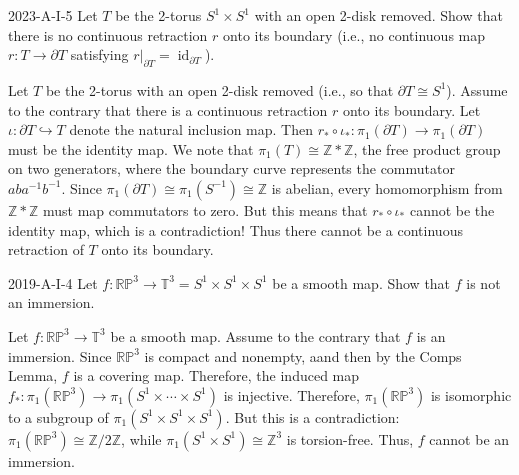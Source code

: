 \documentclass{article}
\begin{document}
	\begin{prb}{2023-A-I-5}
		Let $T$ be the 2-torus $S^{1} \times S^{1}$ with an open 2-disk removed. Show that there is no continuous retraction $r$ onto its boundary (i.e., no continuous map $r: T \to \partial T$ satisfying $r|_{\partial T} = \operatorname{id}_{\partial T}$). 
	\end{prb}
	Let $T$ be the 2-torus with an open 2-disk removed (i.e., so that $\partial T \cong S^{1}$). Assume to the contrary that there is a continuous retraction $r$ onto its boundary. Let $\iota : \partial T \hookrightarrow T$ denote the natural inclusion map. Then $r_{\ast} \circ \iota_{\ast}: \pi_{1}(\partial T) \to \pi_{1}(\partial T)$ must be the identity map. We note that $\pi_{1}(T) \cong \mathbb{Z} \ast \mathbb{Z}$, the free product group on two generators, where the boundary curve represents the commutator $aba^{-1}b^{-1}$. Since $\pi_{1}(\partial T) \cong \pi_{1}(S^{-1}) \cong \mathbb{Z}$ is abelian, every homomorphism from $\mathbb{Z} \ast \mathbb{Z}$ must map commutators to zero. But this means that $r_{\ast} \circ \iota_{\ast}$ cannot be the identity map, which is a contradiction! Thus there cannot be a continuous retraction of $T$ onto its boundary. 
	
	\begin{prb}{2019-A-I-4}
		Let $f: \mathbb{RP}^{3} \to \mathbb{T}^{3} = S^{1} \times S^{1} \times S^{1}$ be a smooth map. Show that $f$ is not an immersion. 
	\end{prb}
	Let $f: \mathbb{RP}^{3} \to \mathbb{T}^{3}$ be a smooth map. Assume to the contrary that $f$ is an immersion. Since $\mathbb{RP}^{3}$ is compact and nonempty, aand then by the Comps Lemma, $f$ is a covering map. Therefore, the induced map $f_{\ast}: \pi_{1}(\mathbb{RP}^{3}) \to \pi_{1}(S^{1} \times \dotsm \times S^{1})$ is injective. Therefore, $\pi_{1}(\mathbb{RP}^{3})$ is isomorphic to a subgroup of $\pi_{1}(S^{1} \times S^{1} \times S^{1})$. But this is a contradiction: $\pi_{1}(\mathbb{RP}^{3}) \cong \mathbb{Z}/2\mathbb{Z}$, while $\pi_{1}(S^{1} \times S^{1}) \cong \mathbb{Z}^{3}$ is torsion-free. Thus, $f$ cannot be an immersion. 
	
\end{document}
